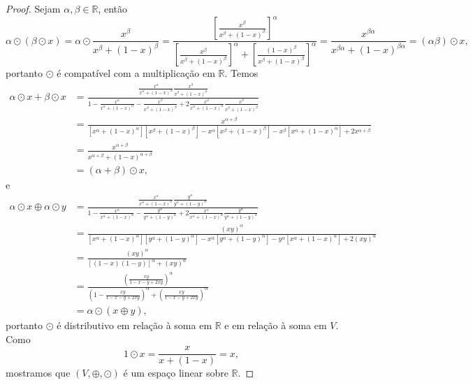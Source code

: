 \begin{proof}
    Sejam \(\alpha, \beta \in \mathbb{R}\), então
    \begin{equation*}
        \alpha \odot (\beta \odot x)
        = \alpha \odot \frac{x^\beta}{x^\beta + (1 - x)^\beta}
        = \frac{\left[\frac{x^\beta}{x^\beta + (1 - x)^\beta} \right]^\alpha}{\left[\frac{x^\beta}{x^\beta + (1 - x)^\beta}\right]^\alpha + \left[\frac{(1- x)^\beta}{x^\beta + (1 - x)^\beta}\right]^\alpha} = \frac{x^{\beta \alpha}}{x^{\beta \alpha} + (1 - x)^{\beta \alpha}} = (\alpha \beta)\odot x,
    \end{equation*}
    portanto \(\odot\) é compatível com a multiplicação em \(\mathbb{R}\). Temos
    \begin{align*}
        \alpha\odot x + \beta\odot x
        &= \frac{\frac{x^\alpha}{x^\alpha + (1- x)^\alpha}\frac{x^\beta}{x^\beta + (1- x)^\beta}}{1 - \frac{x^\alpha}{x^\alpha + (1- x)^\alpha} - \frac{x^\beta}{x^\beta + (1- x)^\beta} + 2 \frac{x^\alpha}{x^\alpha + (1- x)^\alpha}\frac{x^\beta}{x^\beta + (1- x)^\beta}}\\
        &= \frac{x^{\alpha + \beta}}{[x^\alpha + (1 - x)^\alpha][x^\beta + (1 - x)^\beta] - x^\alpha[x^\beta + (1 - x)^\beta] - x^\beta [x^\alpha + (1 - x)^\alpha] + 2x^{\alpha + \beta}}\\
        &= \frac{x^{\alpha + \beta}}{x^{\alpha + \beta} + (1 - x)^{\alpha + \beta}}\\
        &= (\alpha + \beta)\odot x,
    \end{align*}
    e
    \begin{align*}
        \alpha \odot x \oplus \alpha \odot y
        &= \frac{\frac{x^\alpha}{x^\alpha + (1-x)^\alpha}\frac{y^\alpha}{y^\alpha + (1-y)^\alpha}}{1 - \frac{x^\alpha}{x^\alpha + (1-x)^\alpha} - \frac{y^\alpha}{y^\alpha + (1-y)^\alpha} + 2 \frac{x^\alpha}{x^\alpha + (1-x)^\alpha}\frac{y^\alpha}{y^\alpha + (1-y)^\alpha}}\\
        &= \frac{(xy)^\alpha}{[x^\alpha + (1 - x)^\alpha][y^\alpha + (1-y)^\alpha] - x^\alpha [y^\alpha + (1 - y)^\alpha] - y^\alpha[x^\alpha + (1 - x)^\alpha] + 2(xy)^\alpha}\\
        &= \frac{(xy)^\alpha}{[(1 - x)(1 - y)]^\alpha + (xy)^\alpha}\\
        &= \frac{\left(\frac{xy}{1 - x - y + 2xy}\right)^\alpha}{\left(1 - \frac{xy}{1 - x - y + 2xy}\right)^\alpha + \left(\frac{xy}{1 - x - y +2xy}\right)^\alpha}\\
        &= \alpha \odot (x \oplus y),
    \end{align*}
    portanto \(\odot\) é distributivo em relação à soma em \(\mathbb{R}\) e em relação à soma em \(V\). Como
    \begin{equation*}
        1 \odot x = \frac{x}{x + (1-x)} = x,
    \end{equation*}
    mostramos que \((V, \oplus, \odot)\) é um espaço linear sobre \(\mathbb{R}\).
\end{proof}

